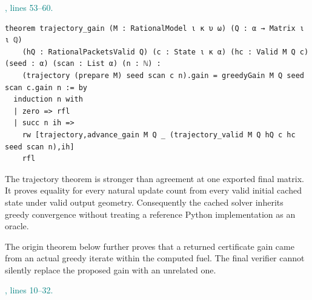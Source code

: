 \documentclass[11pt]{article}\usepackage{needspace}\renewcommand{\paperkind}{Lean companion}\setlength{\parskip}{0.35em}
\begin{document}


{\small\textcolor{teal}{, lines 53--60.}\par}

\begin{lstlisting}[style=BayesSource]
theorem trajectory_gain (M : RationalModel ι κ υ ω) (Q : α → Matrix ι ι ℚ)
    (hQ : RationalPacketsValid Q) (c : State ι κ α) (hc : Valid M Q c) (seed : α) (scan : List α) (n : ℕ) :
    (trajectory (prepare M) seed scan c n).gain = greedyGain M Q seed scan c.gain n := by
  induction n with
  | zero => rfl
  | succ n ih =>
    rw [trajectory,advance_gain M Q _ (trajectory_valid M Q hQ c hc seed scan n),ih]
    rfl
\end{lstlisting}

The trajectory theorem is stronger than agreement at one exported final matrix. It proves equality for every natural update count from every valid initial cached state under valid output geometry. Consequently the cached solver inherits greedy convergence without treating a reference Python implementation as an oracle.

The origin theorem below further proves that a returned certificate gain came from an actual greedy iterate within the computed fuel. The final verifier cannot silently replace the proposed gain with an unrelated one.



{\small\textcolor{teal}{, lines 10--32.}\par}
\end{document}

